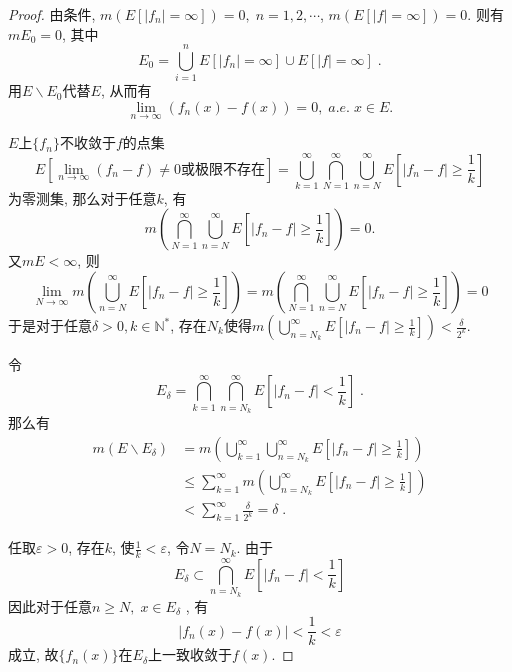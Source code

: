 \begin{proof}

		由条件, $m\left( E[ |f_n| = \infty ] \right) = 0,\; n=1,2,\cdots$, $m( E[ |f| = \infty ] ) = 0$. 则有$mE_0 = 0$, 其中
		$$
			E_0 = \bigcup\limits_{i=1}^n E\left[ |f_n| = \infty \right] \cup E[ |f| = \infty ]\;.
		$$
	用$E \backslash E_0$代替$E$, 从而有
		$$
		\lim\limits_{n \to \infty} (f_n(x) - f(x)) = 0,\; a.e. \; x \in E.
		$$


	$E$上$\{ f_n \}$不收敛于$f$的点集
		$$
		E\left[ \lim\limits_{n \to \infty} (f_n - f) \neq 0 \text{或极限不存在} \right] = 
		\bigcup\limits_{k = 1}^{\infty} \bigcap\limits_{N = 1}^{\infty} \bigcup\limits_{n = N}^{\infty} E \left[ |f_n - f| \geq \frac 1k \right]
		$$
	为零测集, 那么对于任意$k$, 有
		$$
			m \left( \bigcap\limits_{N = 1}^{\infty} \bigcup\limits_{n = N}^{\infty} E \left[ |f_n - f| \geq \frac 1k \right]  \right) = 0. 
		$$
	又$mE < \infty$, 则
		$$
			\lim\limits_{N \to \infty} m \left( \bigcup\limits_{n = N}^{\infty} E \left[ |f_n - f| \geq \frac 1k \right] \right) = m \left( \bigcap\limits_{N = 1}^{\infty} \bigcup\limits_{n = N}^{\infty} E \left[ |f_n - f| \geq \frac 1k \right]  \right) = 0
		$$
	于是对于任意$\delta > 0, k \in \mathbb{N}^*$, 存在$N_k$使得$m\left( \bigcup\limits_{n = N_k}^{\infty} E \left[ |f_n - f| \geq \frac 1k \right] \right) < \frac{\delta}{2^k}$. 


	令
		$$
			E_{\delta} = \bigcap\limits_{k = 1}^{\infty} \bigcap\limits_{n = N_k}^{\infty} E \left[ |f_n - f| < \frac 1k \right]\;.
		$$
	那么有
		$$
			\begin{aligned}
				m(E \backslash E_{\delta})
				&= m \left( \bigcup\limits_{k = 1}^{\infty} \bigcup\limits_{n = N_k}^{\infty} E \left[ |f_n - f| \geq \frac 1k \right] \right) \\
				&\leq \sum\limits_{k = 1}^{\infty} m \left(\bigcup\limits_{n = N_k}^{\infty} E \left[ |f_n - f| \geq \frac 1k \right] \right) \\
				&< \sum\limits_{k = 1}^{\infty} \frac{\delta}{2^k} = \delta\;.
			\end{aligned}
		$$


	任取$\varepsilon > 0$, 存在$k$, 使$\frac 1k < \varepsilon$, 令$N = N_k$. 由于
		$$
			E_{\delta} \subset \bigcap\limits_{n = N_k}^{\infty} E \left[ |f_n - f| < \frac 1k \right]
		$$
	因此对于任意$n \geq N,\; x\in E_{\delta}$ , 有
		$$
			|f_n(x) - f(x) | < \frac 1k < \varepsilon
		$$
	成立, 故$\{ f_n(x) \}$在$E_{\delta}$上一致收敛于$f(x)$. 
\end{proof} 
 
